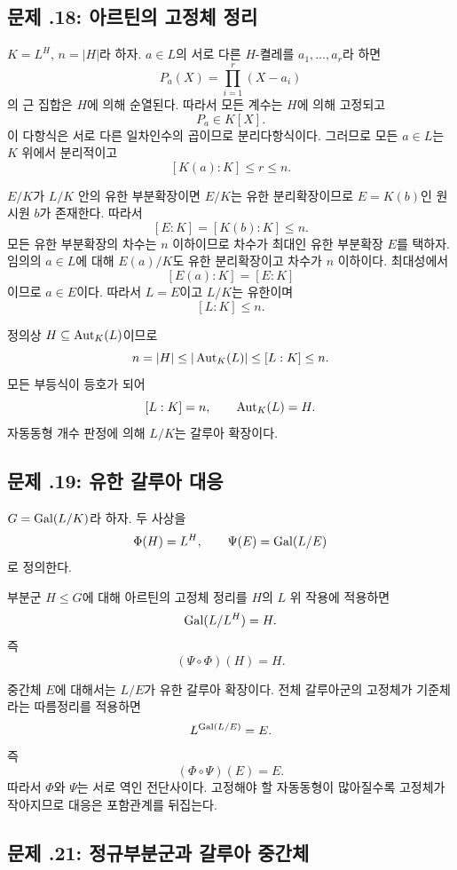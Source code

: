 \subsection*{문제 \thechapter.18: 아르틴의 고정체 정리}

\begin{solution}
$K=L^H$, $n=|H|$라 하자. $a\in L$의 서로 다른 $H$-켤레를 $a_1,\dots,a_r$라 하면
\[
  P_a(X)=\prod_{i=1}^r(X-a_i)
\]
의 근 집합은 $H$에 의해 순열된다. 따라서 모든 계수는 $H$에 의해 고정되고
\[
  P_a\in K[X].
\]
이 다항식은 서로 다른 일차인수의 곱이므로 분리다항식이다. 그러므로 모든 $a\in L$는 $K$ 위에서 분리적이고
\[
  [K(a):K]\le r\le n.
\]

$E/K$가 $L/K$ 안의 유한 부분확장이면 $E/K$는 유한 분리확장이므로 $E=K(b)$인 원시원 $b$가 존재한다. 따라서
\[
  [E:K]=[K(b):K]\le n.
\]
모든 유한 부분확장의 차수는 $n$ 이하이므로 차수가 최대인 유한 부분확장 $E$를 택하자. 임의의 $a\in L$에 대해 $E(a)/K$도 유한 분리확장이고 차수가 $n$ 이하이다. 최대성에서
\[
  [E(a):K]=[E:K]
\]
이므로 $a\in E$이다. 따라서 $L=E$이고 $L/K$는 유한이며
\[
  [L:K]\le n.
\]

정의상 $H\subseteq\operatorname{Aut}_K(L)$이므로
\[
  n=|H|
  \le|\operatorname{Aut}_K(L)|
  \le[L:K]
  \le n.
\]
모든 부등식이 등호가 되어
\[
  [L:K]=n,
  \qquad
  \operatorname{Aut}_K(L)=H.
\]
자동동형 개수 판정에 의해 $L/K$는 갈루아 확장이다.
\end{solution}

\subsection*{문제 \thechapter.19: 유한 갈루아 대응}

\begin{solution}
$G=\operatorname{Gal}(L/K)$라 하자. 두 사상을
\[
  \Phi(H)=L^H,
  \qquad
  \Psi(E)=\operatorname{Gal}(L/E)
\]
로 정의한다.

부분군 $H\le G$에 대해 아르틴의 고정체 정리를 $H$의 $L$ 위 작용에 적용하면
\[
  \operatorname{Gal}(L/L^H)=H.
\]
즉
\[
  (\Psi\circ\Phi)(H)=H.
\]

중간체 $E$에 대해서는 $L/E$가 유한 갈루아 확장이다. 전체 갈루아군의 고정체가 기준체라는 따름정리를 적용하면
\[
  L^{\operatorname{Gal}(L/E)}=E.
\]
즉
\[
  (\Phi\circ\Psi)(E)=E.
\]
따라서 $\Phi$와 $\Psi$는 서로 역인 전단사이다. 고정해야 할 자동동형이 많아질수록 고정체가 작아지므로 대응은 포함관계를 뒤집는다.
\end{solution}

\subsection*{문제 \thechapter.21: 정규부분군과 갈루아 중간체}

